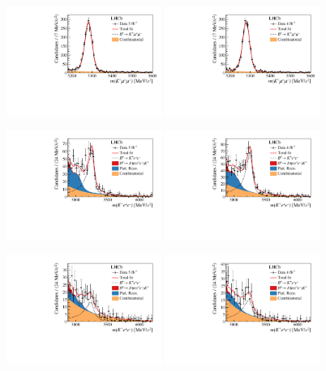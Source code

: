 \begin{figure}
    \centering
    \includegraphics[width=0.45\textwidth]{figures/Fig6a.pdf}
    \includegraphics[width=0.45\textwidth]{figures/Fig6b.pdf}

    \includegraphics[width=0.45\textwidth]{figures/Fig6c.pdf}
    \includegraphics[width=0.45\textwidth]{figures/Fig6d.pdf}
    
    \includegraphics[width=0.45\textwidth]{figures/Fig6e.pdf}
    \includegraphics[width=0.45\textwidth]{figures/Fig6f.pdf}
    

\end{figure}
